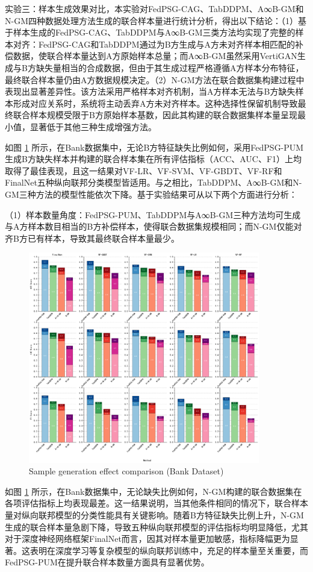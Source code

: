 实验三：样本生成效果对比，本实验对FedPSG-CAG、TabDDPM、A∞B-GM和N-GM四种数据处理方法生成的联合样本量进行统计分析，得出以下结论：（1）基于样本生成的FedPSG-CAG、TabDDPM与A∞B-GM三类方法均实现了完整的样本对齐：FedPSG-CAG和TabDDPM通过为B方生成与A方未对齐样本相匹配的补偿数据，使联合样本量达到A方原始样本总量；而A∞B-GM虽然采用VertiGAN生成与B方缺失量相当的合成数据，但由于其生成过程严格遵循A方样本分布特征，最终联合样本量仍由A方数据规模决定。（2）N-GM方法在联合数据集构建过程中表现出显著差异性。该方法采用严格样本对齐机制，当A方样本无法与B方缺失样本形成对应关系时，系统将主动丢弃A方未对齐样本。这种选择性保留机制导致最终联合样本规模受限于B方原始样本基数，因此其构建的联合数据集样本量呈现最小值，显著低于其他三种生成增强方法。

如图 \ref{Chapter4Exp3Bank} 所示，在Bank数据集中，无论B方特征缺失比例如何，采用FedPSG-PUM生成B方缺失样本并构建的联合样本集在所有评估指标（ACC、AUC、F1）上均取得了最佳表现，且这一结果对VF-LR、VF-SVM、VF-GBDT、VF-RF和FinalNet五种纵向联邦分类模型皆适用。与之相比，TabDDPM、A∞B-GM和N-GM三种方法的模型性能依次下降。基于实验结果可从以下两个方面进行分析：

（1）样本数量角度：FedPSG-PUM、TabDDPM与A∞B-GM三种方法均可生成与A方样本数目相当的B方补偿样本，使得联合数据集规模相同；而N-GM仅能对齐B方已有样本，导致其最终联合样本量最少。
\vspace{-0.1cm}
\begin{figure}[h]
	\centering
	\includegraphics[width=0.9\textwidth]{chapters/imgs/Chapter4Exp3Bank}
	{\wuhao Sample generation effect comparison (Bank Dataset)}
	\label{Chapter4Exp3Bank}
\end{figure}
\vspace{-0.35cm}
如图 \ref{Chapter4Exp3Bank} 所示，在Bank数据集中，无论缺失比例如何，N-GM构建的联合数据集在各项评估指标上均表现最差。这一结果说明，当其他条件相同的情况下，联合样本量对纵向联邦模型的分类性能具有关键影响。随着B方特征缺失比例上升，N-GM生成的联合样本量急剧下降，导致五种纵向联邦模型的评估指标均明显降低，尤其对于深度神经网络框架FinalNet而言，因其对样本量更加敏感，指标降幅更为显著。这表明在深度学习等复杂模型的纵向联邦训练中，充足的样本量至关重要，而FedPSG-PUM在提升联合样本数量方面具有显著优势。

